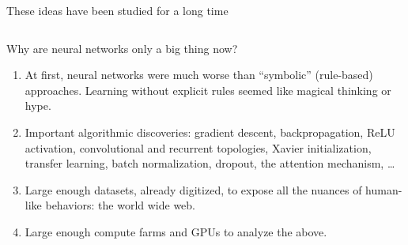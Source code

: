 \documentclass[aspectratio=169]{beamer}
\begin{document}
\begin{frame}{These ideas have been studied for a long time}
\vspace{0.2 cm}
\begin{columns}
\end{columns}
\end{frame}

\begin{frame}{Why are neural networks only a big thing now?}
\vspace{0.5 cm}
\begin{enumerate}\setlength{\itemsep}{0.5 cm}
\item<1-> At first, neural networks were much worse than ``symbolic'' (rule-based) approaches. Learning without explicit rules seemed like magical thinking or hype.

\item<2-> Important algorithmic discoveries: gradient descent, backpropagation, ReLU activation, convolutional and recurrent topologies, Xavier initialization, transfer learning, batch normalization, dropout, the attention mechanism, \ldots

\item<3-> Large enough datasets, already digitized, to expose all the nuances of human-like behaviors: the world wide web.

\item<4-> Large enough compute farms and GPUs to analyze the above.
\end{enumerate}
\end{frame}
\end{document}
